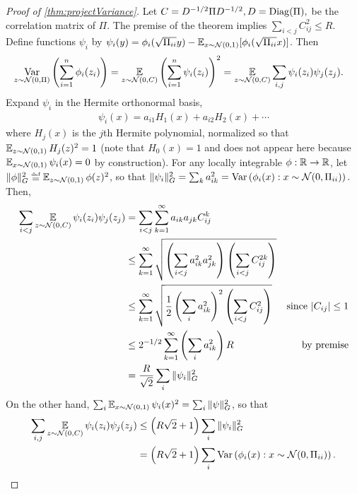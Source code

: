 \documentclass[main.tex]{subfiles}
\begin{document}
\begin{proof}[Proof of \cref{thm:projectVariance}]
Let $C = D^{-1/2} \Pi D^{-1/2}, D = \mathrm{Diag}(\Pi),$ be the correlation matrix of $\Pi$.
The premise of the theorem implies $\sum_{i<j} C_{ij}^2 \le R$.
Define functions $\psi_i$ by $\psi_i(y) = \phi_i(\sqrt{\Pi_{ii}}y) - \operatorname*{\mathbb{E}}_{x \sim \mathcal{N}(0, 1)}[\phi_i(\sqrt{\Pi_{ii}}x)]$.
Then
\begin{align*}
\operatorname*{\operatorname{Var}}_{z \sim \mathcal{N}(0, \Pi)}\left( \sum_{i=1}^n \phi_i(z_i) \right)
    &=
        \operatorname*{\mathbb{E}}_{z \sim \mathcal{N}(0, C)}
            \left( \sum_{i=1}^n \psi_i(z_i) \right)^2
    =
        \operatorname*{\mathbb{E}}_{z \sim \mathcal{N}(0, C)}
            \sum_{i,j} \psi_i(z_i) \psi_j(z_j).
\end{align*}
Expand $\psi_i$ in the Hermite orthonormal basis,
\begin{align*}
    \psi_i(x) = a_{i1} H_1(x) + a_{i2} H_2(x) + \cdots
\end{align*}
where $H_j(x)$ is the $j$th Hermite polynomial, normalized so that $\operatorname*{\mathbb{E}}_{z \sim \mathcal{N}(0, 1)} H_j(z)^2 = 1$ (note that $H_0(x) = 1$ and does not appear here because $\operatorname*{\mathbb{E}}_{x \sim \mathcal{N}(0, 1)}\psi_i(x) = 0$ by construction).
For any locally integrable $\phi: \mathbb{R} \to \mathbb{R}$, let $\|\phi\|_G^2 \defeq \EV_{z \sim \Gaus(0, 1)} \phi(z)^2$, so that $\|\psi_i\|_G^2 = \sum_k a_{ik}^2 = \operatorname*{\operatorname{Var}}\left( \phi_i(x) : x \sim \mathcal{N}(0, \Pi_{ii})\right).$
Then,
\begin{align*}
    \sum_{i < j} \EV_{z \sim \Gaus(0, C)} \psi_i(z_i) \psi_j(z_j)
        &=
            \sum_{i<j} \sum_{k=1}^\infty a_{ik} a_{jk} C_{ij}^k
            \\
        &\le
            \sum_{k=1}^\infty \sqrt{\lp \sum_{i<j} a_{ik}^2 a_{jk}^2\rp
                                    \lp \sum_{i<j} C_{ij}^{2k}\rp}
            \\
        &\le
            \sum_{k=1}^\infty \sqrt{\f 1 2 \lp \sum_{i} a_{ik}^2\rp^2
                                    \lp \sum_{i<j} C_{ij}^2\rp}
        &
            \pushright{\text{since $|C_{ij}| \le 1$}}
            \\
        &\le
            2^{-1/2}\sum_{k=1}^\infty \lp \sum_{i} a_{ik}^2\rp R
        &
            \pushright{\text{by premise}}
            \\
        &=
            \f R {\sqrt 2} \sum_i \|\psi_i\|_G^2
\end{align*}
On the other hand, $\sum_i \operatorname*{\mathbb{E}}_{x \sim \mathcal{N}(0, 1)} \psi_i(x)^2 = \sum_i \|\psi\|_G^2$, so that
\begin{align*}
    \sum_{i,j}\operatorname*{\mathbb{E}}_{z \sim \mathcal{N}(0, C)} \psi_i(z_i) \psi_j(z_j)
        &\le
            \left( R \sqrt 2 + 1 \right) \sum_i \|\psi_i\|_G^2
            \\
        &=
            \left( R \sqrt 2 + 1 \right) \sum_i \operatorname*{\operatorname{Var}}\left( \phi_i(x) : x \sim \mathcal{N}(0, \Pi_{ii})\right).
\end{align*}

\end{proof}
\end{document}
